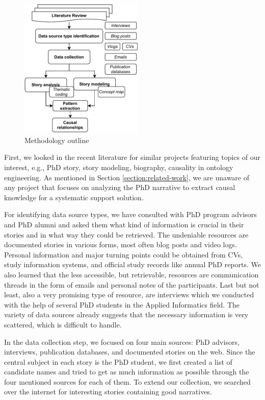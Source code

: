 \documentclass[sigconf]{acmart}
\begin{document}
\begin{figure}[ht]
  \centering
  \includegraphics[width=5.9cm]{pictures/methodology.pdf}
  \caption[methodology]{Methodology outline}%
  \label{fig:methodology}
\end{figure}

First, we looked in the recent literature for similar projects featuring topics of our interest, e.g., PhD story, story modeling, biography, causality in ontology engineering. As mentioned in Section \ref{section:related-work}, we are unaware of any project that focuses on analyzing the PhD narrative to extract causal knowledge for a systematic support solution. %

For identifying data source types, we have consulted with PhD program advisors and PhD alumni and asked them what kind of information is crucial in their stories and in what way they could be retrieved. The undeniable resources are documented stories in various forms, most often blog posts and video logs. Personal information and major turning points could be obtained from CVs, study information systems, and official study records like annual PhD reports. We also learned that the less accessible, but retrievable, resources are communication threads in the form of emails and personal notes of the participants. Last but not least, also a very promising type of resource, are interviews which we conducted with the help of several PhD students in the Applied Informatics field. The variety of data sources already suggests that the necessary information is very scattered, which is difficult to handle.

In the data collection step, we focused on four main sources: PhD advisors, interviews, publication databases, and documented stories on the web.%
Since the central subject in each story is the PhD student, we first created a list of candidate names and tried to get as much information as possible through the four mentioned sources for each of them. To extend our collection, we searched over the internet for interesting stories containing good narratives. %
\end{document}
